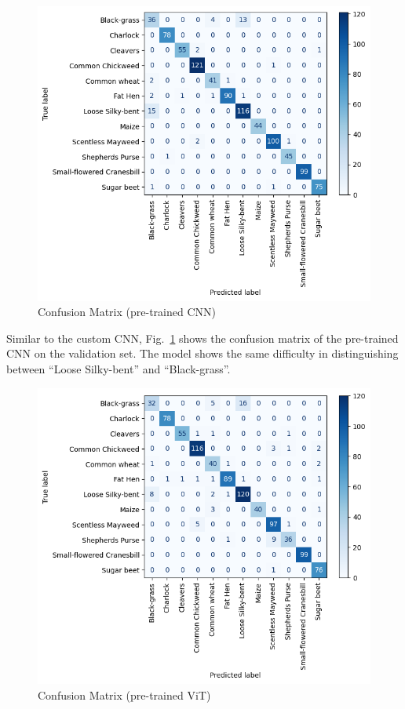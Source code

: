 \begin{figure}[htbp]
    \centerline{\includegraphics[width=0.9\linewidth]{../../resources/resnet/confusion.png}}
    \caption{Confusion Matrix (pre-trained CNN)}
    \label{fig:confusion-matrix-pretrained-cnn}
\end{figure}

Similar to the custom CNN, Fig.~\ref{fig:confusion-matrix-pretrained-cnn} shows the confusion matrix of the pre-trained CNN on the validation set. The model shows the same difficulty in distinguishing between ``Loose Silky-bent'' and ``Black-grass''.

\begin{figure}[htbp]
    \centerline{\includegraphics[width=0.9\linewidth]{../../resources/vit/confusion.png}}
    \caption{Confusion Matrix (pre-trained ViT)}
    \label{fig:confusion-matrix-pretrained-vit}
\end{figure}

